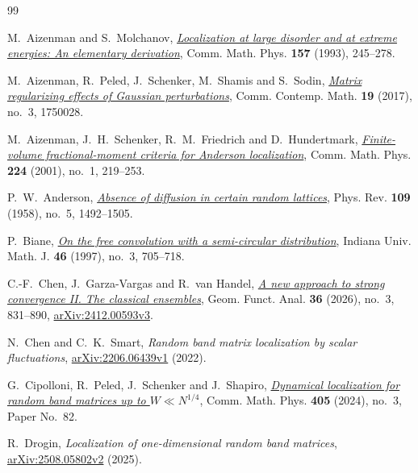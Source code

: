 \documentclass[11pt]{article}
\numberwithin{equation}{section}
\theoremstyle{remark}
\begin{document}
{}
\begin{thebibliography}{99}
\hypersetup{urlcolor=black}

M.~Aizenman and S.~Molchanov,
\href{https://doi.org/10.1007/BF02099760}{\emph{Localization at large disorder and at extreme energies:
An elementary derivation}},
Comm. Math. Phys. \textbf{157} (1993), 245--278.

M.~Aizenman, R.~Peled, J.~Schenker, M.~Shamis and S.~Sodin,
\href{https://doi.org/10.1142/S0219199717500286}{\emph{Matrix regularizing effects of Gaussian perturbations}},
Comm. Contemp. Math. \textbf{19} (2017), no.~3, 1750028.

M.~Aizenman, J.~H.~Schenker, R.~M.~Friedrich and D.~Hundertmark,
\href{https://doi.org/10.1007/s002200100441}{\emph{Finite-volume fractional-moment criteria for Anderson localization}},
Comm. Math. Phys. \textbf{224} (2001), no.~1, 219--253.

P.~W.~Anderson, \href{https://doi.org/10.1103/PhysRev.109.1492}{\emph{Absence of diffusion in certain random lattices}},
Phys. Rev. \textbf{109} (1958), no.~5, 1492--1505.

P.~Biane, \href{https://doi.org/10.1512/iumj.1997.46.1467}{\emph{On the free convolution with a semi-circular distribution}},
Indiana Univ. Math. J. \textbf{46} (1997), no.~3, 705--718.

C.-F.~Chen, J.~Garza-Vargas and R.~van Handel,
\href{https://doi.org/10.1007/s00039-026-00744-2}{\emph{A new approach to strong convergence II. The classical ensembles}},
Geom. Funct. Anal. \textbf{36} (2026), no.~3, 831--890,
\href{https://arxiv.org/abs/2412.00593v3}{arXiv:2412.00593v3}.

N.~Chen and C.~K.~Smart,
\emph{Random band matrix localization by scalar fluctuations},
\href{https://arxiv.org/abs/2206.06439v1}{arXiv:2206.06439v1} (2022).

G.~Cipolloni, R.~Peled, J.~Schenker and J.~Shapiro,
\href{https://doi.org/10.1007/s00220-024-04948-1}{\emph{Dynamical localization for random band matrices up to $W\ll N^{1/4}$}},
Comm. Math. Phys. \textbf{405} (2024), no.~3, Paper No.~82.

R.~Drogin, \emph{Localization of one-dimensional random band matrices},
\href{https://arxiv.org/abs/2508.05802v2}{arXiv:2508.05802v2} (2025).


\end{thebibliography}
\end{document}
